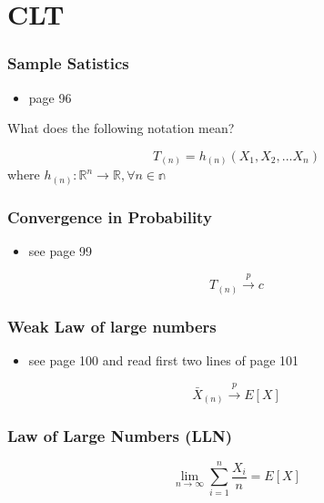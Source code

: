 \documentclass[
]{article}
\providecommand{\tightlist}{%
  \setlength{\itemsep}{0pt}\setlength{\parskip}{0pt}}
\begin{document}
\hypertarget{clt}{%
\section{CLT}\label{clt}}

\hypertarget{sample-satistics}{%
\subsubsection{Sample Satistics}\label{sample-satistics}}

\begin{itemize}
\tightlist
\item
  page 96
\end{itemize}

What does the following notation mean?

\[T_{(n)} = h_{(n)}(X_1,X_2,...X_n)\] where
\(h_{(n)}:\mathbb{R}^n \rightarrow \mathbb{R}, \forall n \in \mathbb{n}\)

\hypertarget{convergence-in-probability}{%
\subsubsection{Convergence in
Probability}\label{convergence-in-probability}}

\begin{itemize}
\tightlist
\item
  see page 99
\end{itemize}

\[T_{(n)} \xrightarrow p c\]

\hypertarget{weak-law-of-large-numbers}{%
\subsubsection{Weak Law of large
numbers}\label{weak-law-of-large-numbers}}

\begin{itemize}
\tightlist
\item
  see page 100 and read first two lines of page 101
\end{itemize}

\[\bar{X}_{(n)} \xrightarrow p E[X]\]

\hypertarget{law-of-large-numbers-lln}{%
\subsubsection{Law of Large Numbers
(LLN)}\label{law-of-large-numbers-lln}}

\[\lim\limits_{n \rightarrow \infty} \sum_{i=1}^{n}\frac{X_i}{n}=E[X]\]
\end{document}
